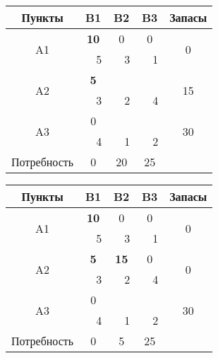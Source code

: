 \documentclass[a4paper,12pt]{article}
\begin{document}
	\begin{center}
		\begin{tabular}{|c|c|c|c|c|c|c|c}
			\hline
			Пункты & \multicolumn{2}{c|}{B1} & \multicolumn{2}{c|}{B2} & \multicolumn{2}{c|}{B3} & \multicolumn{1}{c|}{Запасы} \\ \hline
			\multirow{2}{*}{A1} & \multicolumn{2}{c|}{\textbf{10}} & \multicolumn{2}{c|}{0} & \multicolumn{2}{c|}{0} & \multicolumn{1}{c|}{\multirow{2}{*}{0}} \\ \cline{2-7}
			&  & 5 &  & 3 &  & 1 & \multicolumn{1}{c|}{} \\ \hline
			\multirow{2}{*}{A2} & \multicolumn{2}{c|}{\textbf{5}} & \multicolumn{2}{c|}{} & \multicolumn{2}{c|}{} & \multicolumn{1}{c|}{\multirow{2}{*}{15}} \\ \cline{2-7}
			&  & 3 &  & 2 &  & 4 & \multicolumn{1}{c|}{} \\ \hline
			\multirow{2}{*}{A3} & \multicolumn{2}{c|}{0} & \multicolumn{2}{c|}{} & \multicolumn{2}{c|}{} & \multicolumn{1}{c|}{\multirow{2}{*}{30}} \\ \cline{2-7}
			&  & 4 &  & 1 &  & 2 & \multicolumn{1}{c|}{} \\ \hline
			Потребность & \multicolumn{2}{c|}{0} & \multicolumn{2}{c|}{20} & \multicolumn{2}{c|}{25} &  \\ \cline{1-7}
		\end{tabular}
		\begin{tabular}{|c|c|c|c|c|c|c|c}
			\hline
			Пункты & \multicolumn{2}{c|}{B1} & \multicolumn{2}{c|}{B2} & \multicolumn{2}{c|}{B3} & \multicolumn{1}{c|}{Запасы} \\ \hline
			\multirow{2}{*}{A1} & \multicolumn{2}{c|}{\textbf{10}} & \multicolumn{2}{c|}{0} & \multicolumn{2}{c|}{0} & \multicolumn{1}{c|}{\multirow{2}{*}{0}} \\ \cline{2-7}
			&  & 5 &  & 3 &  & 1 & \multicolumn{1}{c|}{} \\ \hline
			\multirow{2}{*}{A2} & \multicolumn{2}{c|}{\textbf{5}} & \multicolumn{2}{c|}{\textbf{15}} & \multicolumn{2}{c|}{0} & \multicolumn{1}{c|}{\multirow{2}{*}{0}} \\ \cline{2-7}
			&  & 3 &  & 2 &  & 4 & \multicolumn{1}{c|}{} \\ \hline
			\multirow{2}{*}{A3} & \multicolumn{2}{c|}{0} & \multicolumn{2}{c|}{} & \multicolumn{2}{c|}{} & \multicolumn{1}{c|}{\multirow{2}{*}{30}} \\ \cline{2-7}
			&  & 4 &  & 1 &  & 2 & \multicolumn{1}{c|}{} \\ \hline
			Потребность & \multicolumn{2}{c|}{0} & \multicolumn{2}{c|}{5} & \multicolumn{2}{c|}{25} &  \\ \cline{1-7}
		\end{tabular}
	\end{center}
	
\end{document}
